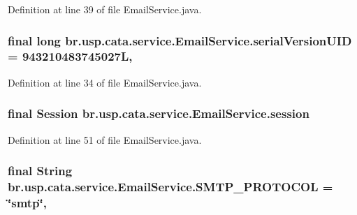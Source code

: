 Definition at line 39 of file Email\+Service.\+java.

\hypertarget{classbr_1_1usp_1_1cata_1_1service_1_1_email_service_ac3ac333b655045e9597db2ba8a7cb86a}{
\subsubsection[{serial\+Version\+U\+I\+D}]{\setlength{\rightskip}{0pt plus 5cm}final long br.\+usp.\+cata.\+service.\+Email\+Service.\+serial\+Version\+U\+I\+D = 943210483745027\+L\hspace{0.3cm}{\ttfamily [static]}, {\ttfamily [private]}}}\label{classbr_1_1usp_1_1cata_1_1service_1_1_email_service_ac3ac333b655045e9597db2ba8a7cb86a}


Definition at line 34 of file Email\+Service.\+java.

\hypertarget{classbr_1_1usp_1_1cata_1_1service_1_1_email_service_aaff5f980e96cf78a79aabe980bb9b11f}{
\subsubsection[{session}]{\setlength{\rightskip}{0pt plus 5cm}final Session br.\+usp.\+cata.\+service.\+Email\+Service.\+session\hspace{0.3cm}{\ttfamily [private]}}}\label{classbr_1_1usp_1_1cata_1_1service_1_1_email_service_aaff5f980e96cf78a79aabe980bb9b11f}


Definition at line 51 of file Email\+Service.\+java.

\hypertarget{classbr_1_1usp_1_1cata_1_1service_1_1_email_service_a0ba51bf199752796ea41d35d70426a03}{
\subsubsection[{S\+M\+T\+P\+\_\+\+P\+R\+O\+T\+O\+C\+O\+L}]{\setlength{\rightskip}{0pt plus 5cm}final String br.\+usp.\+cata.\+service.\+Email\+Service.\+S\+M\+T\+P\+\_\+\+P\+R\+O\+T\+O\+C\+O\+L = \char`\"{}smtp\char`\"{}\hspace{0.3cm}{\ttfamily [static]}, {\ttfamily [private]}}}\label{classbr_1_1usp_1_1cata_1_1service_1_1_email_service_a0ba51bf199752796ea41d35d70426a03}


